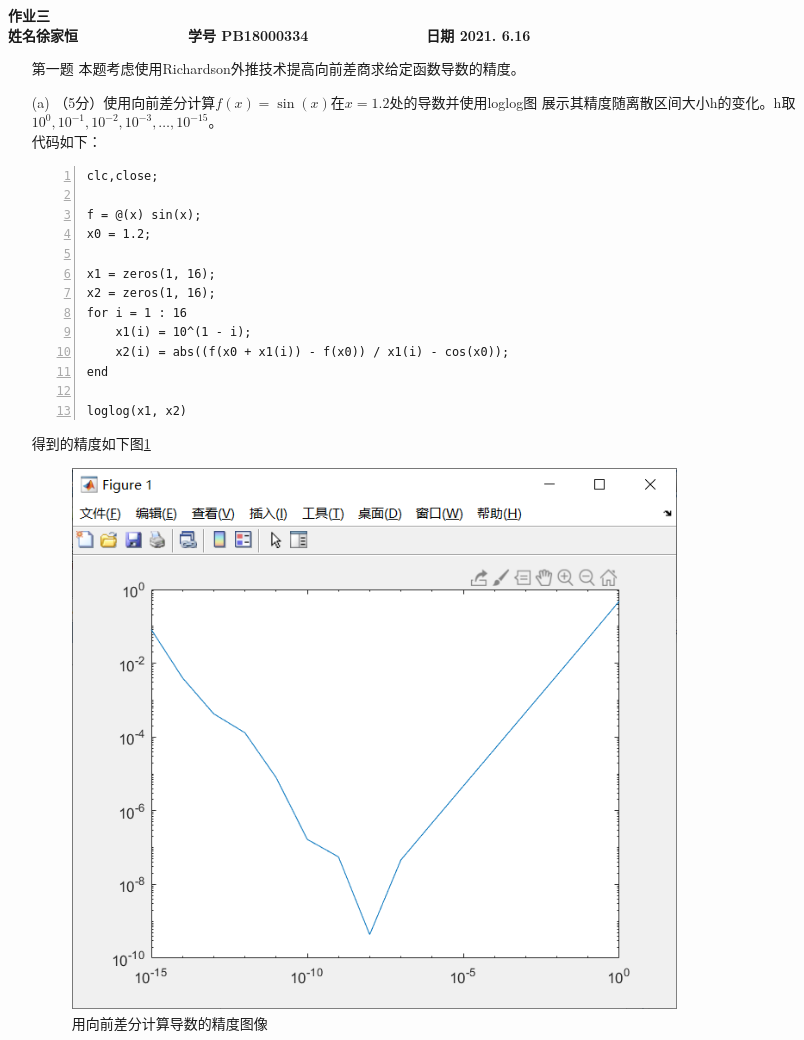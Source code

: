 \documentclass[12pt,a4paper,UTF8]{ctexart}
\begin{document}


\begin{center}
\textbf{作业三}\\
\textbf{姓名\quad 徐家恒~~~~~~~~~~~~~ 学号 PB18000334~~~~~~~~~~~~~~ 日期 2021.	6.16}\\
\end{center}

\begin{center}
\fbox{
\begin{minipage}{40em}
\vspace{5cm}
\hspace{20cm}
\end{minipage}}
\end{center}
\vspace{1cm}

\begin{enumerate}
	\item[第一题]
	本题考虑使用Richardson外推技术提高向前差商求给定函数导数的精度。

	(a) （5分）使用向前差分计算$f(x) = \sin(x)$在$x = 1.2$处的导数并使用loglog图
展示其精度随离散区间大小h的变化。h取$10^0, 10^{-1}, 10^{-2}, 10^{-3}, \dots, 10^{-15}$。\\

	代码如下：\\
\begin{lstlisting}[frame=single,numbers=left]
clc,close;

f = @(x) sin(x);
x0 = 1.2;

x1 = zeros(1, 16);
x2 = zeros(1, 16);
for i = 1 : 16
    x1(i) = 10^(1 - i);
    x2(i) = abs((f(x0 + x1(i)) - f(x0)) / x1(i) - cos(x0));
end

loglog(x1, x2)
\end{lstlisting}

	得到的精度如下图\ref{jpg:1}\\
	\begin{figure}[H]
		\centering
     	\includegraphics[width=0.8\textwidth]{1.png}
    	\caption{用向前差分计算导数的精度图像}\label{jpg:1}
	\end{figure}


\end{enumerate}
\end{document}
